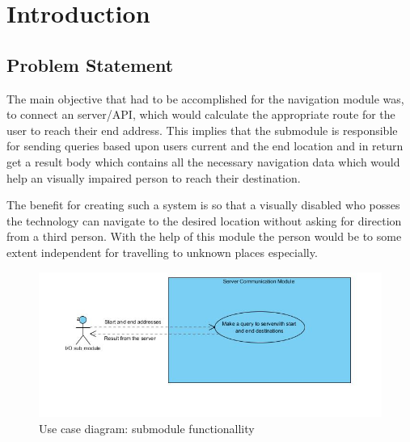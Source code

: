 \newpage
\chapter{Introduction}
	\section{Problem Statement}
		\label{sec:introProblemStatement}
		The main objective that had to be accomplished for the navigation module was, to connect an 
		server/API, which would calculate the appropriate route for the user to reach their end address. 
		This implies that the submodule is responsible for sending queries based upon users 
		current and the end location and in return get a result body which contains
		all the necessary navigation data which would help an visually impaired person to reach their 
		destination.
		
		\par
			The benefit for creating such a system is so that a visually disabled who posses
			the technology can navigate to the desired location without asking for direction
			from a third person. With the help of this module the person would be
			to some extent independent for travelling to unknown places especially. 
	
		\begin{figure}[htbp!]
			\centering \includegraphics[scale=0.8]{grafiken/googleServerCommunication.jpg}
			\caption{Use case diagram: submodule functionallity}
			\label{fig:Google API communication}
		\end{figure}

